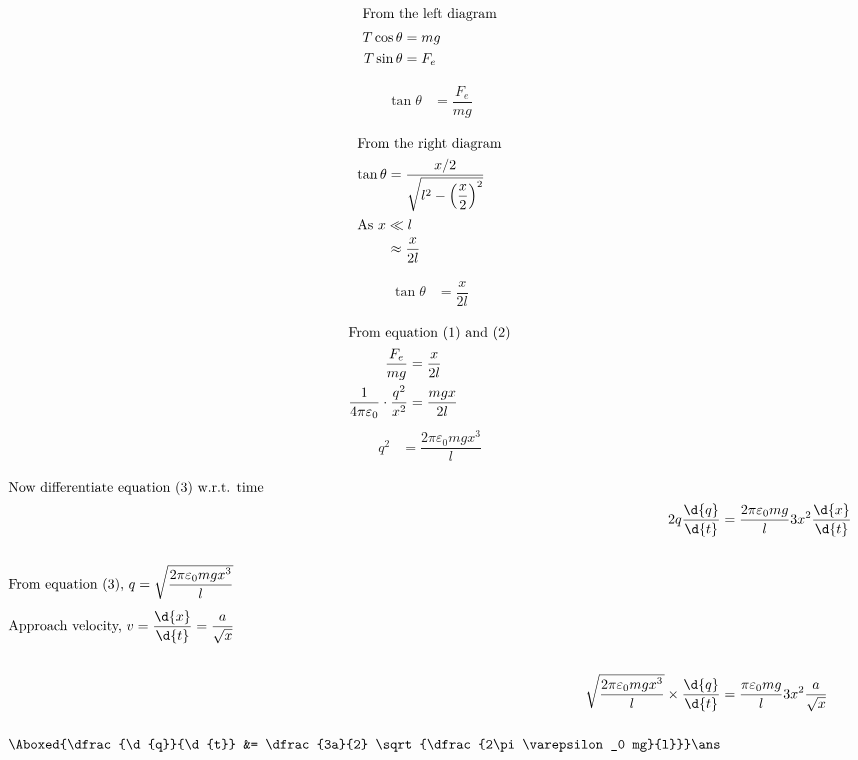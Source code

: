 \documentclass{article}
\begin{document}
\addtolength{\jot}{2ex}
\begin{align*}
\intertext{From the left diagram}
T\cos\theta &= mg\\
T\sin\theta &= F_e 
\end{align*}

\begin{align}
\tan\theta &= \dfrac{F_e}{mg}
\end{align}

\pagebreak
\begin{align*}
\intertext{From the right diagram}
\tan\theta &= \dfrac{x/2}{\sqrt{l^2-\left(\dfrac{x}{2}\right)^2}}\\
\intertext{As $x\ll l$}
	&\approx \dfrac{x}{2l}
\end{align*}

\begin{align}
\tan\theta &= \dfrac{x}{2l}
\end{align}

\begin{align*}
\intertext{From equation (1) and (2)}
\dfrac{F_e}{mg} &= \dfrac{x}{2l}\\
\dfrac{1}{4\pi\varepsilon_0} \cdot \dfrac{q^2}{x^2} &= \dfrac{mgx}{2l}
\end{align*}
\begin{align}
q^2 &= \dfrac{2\pi\varepsilon_0 mgx^3}{l}
\end{align}
\pagebreak

\begin{align*}
\intertext{Now differentiate equation (3) w.r.t. time}
2q\dfrac{\d{q}}{\d{t}} &= \dfrac{2\pi\varepsilon_0 mg}{l}3x^2\dfrac{\d{x}}{\d{t}}\\[5mm]
\intertext{From equation (3), $q=\sqrt{\dfrac{2\pi\varepsilon_0 mg x^3}{l}}$}
\intertext{Approach velocity, $v=\dfrac{\d{x}}{\d{t}}=\dfrac{a}{\sqrt{x}}$}\\
	\sqrt{\dfrac{2\pi\varepsilon_0 mg x^3}{l}} \times \dfrac{\d{q}}{\d{t}} &= \dfrac{\pi\varepsilon_0 mg}{l}3x^2 \dfrac{a}{\sqrt{x}}\\[5mm]
	\Aboxed{\dfrac{\d{q}}{\d{t}} &= \dfrac{3a}{2} \sqrt{\dfrac{2\pi\varepsilon_0 mg}{l}}} \ans
\end{align*}

\pagebreak

\vspace*{\fill}
\begin{center}
	\fbox{\qrcode[height=2cm]{\gdrive}}
\end{center}
\vspace*{\fill}
\end{document}
